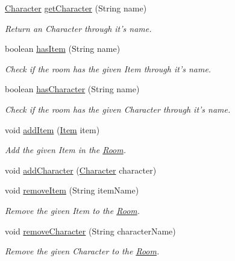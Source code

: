 \begin{DoxyCompactItemize}
\hyperlink{classpkg__world_1_1pkg__characters_1_1Character}{Character} \hyperlink{classpkg__world_1_1Room_afe89d01c098acd297e91d313cb65aff1}{get\-Character} (String name)
\begin{DoxyCompactList}\small\item\em Return an Character through it's name. \end{DoxyCompactList}\item 
boolean \hyperlink{classpkg__world_1_1Room_aefa26e1bc5088dd199dde2e9d471c490}{has\-Item} (String name)
\begin{DoxyCompactList}\small\item\em Check if the room has the given Item through it's name. \end{DoxyCompactList}\item 
boolean \hyperlink{classpkg__world_1_1Room_a96612764dfeea7855090e586f02da188}{has\-Character} (String name)
\begin{DoxyCompactList}\small\item\em Check if the room has the given Character through it's name. \end{DoxyCompactList}\item 
void \hyperlink{classpkg__world_1_1Room_a118585101b274edfdd43b724382de89c}{add\-Item} (\hyperlink{classpkg__world_1_1pkg__items_1_1Item}{Item} item)
\begin{DoxyCompactList}\small\item\em Add the given Item in the \hyperlink{classpkg__world_1_1Room}{Room}. \end{DoxyCompactList}\item 
void \hyperlink{classpkg__world_1_1Room_a8446601b93b79b1e0ab0c8be500f40b1}{add\-Character} (\hyperlink{classpkg__world_1_1pkg__characters_1_1Character}{Character} character)
\item 
void \hyperlink{classpkg__world_1_1Room_ab84c99b33e69d4a3e0700cab4b9efeaa}{remove\-Item} (String item\-Name)
\begin{DoxyCompactList}\small\item\em Remove the given Item to the \hyperlink{classpkg__world_1_1Room}{Room}. \end{DoxyCompactList}\item 
void \hyperlink{classpkg__world_1_1Room_adca74901eed0132c7bb9ba15b993ac0b}{remove\-Character} (String character\-Name)
\begin{DoxyCompactList}\small\item\em Remove the given Character to the \hyperlink{classpkg__world_1_1Room}{Room}. \end{DoxyCompactList}\item 

\end{DoxyCompactItemize}
